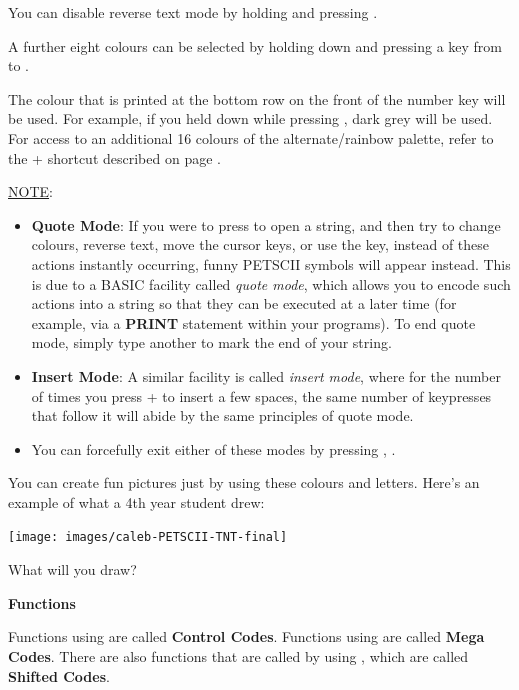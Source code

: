 You can disable reverse text mode by holding  and pressing .

A further eight colours can be selected by holding down \megasymbolkey and pressing a key from  to .

The colour that is printed at the bottom row on the front of the number key will be used. For example, if you held
\megasymbolkey down while pressing , dark grey will be used. For access to an additional 16 colours of the alternate/rainbow palette, refer to the  +  shortcut described on page \pageref{appendix:controlcodes}.

\underline{NOTE}:
\begin{itemize}
  \item {\bf Quote Mode}: If you were to press  to open a string, and then try to change
colours, reverse text, move the cursor keys, or use the  key, instead
of these actions instantly occurring, funny PETSCII symbols will appear instead. This is
due to a BASIC facility called {\it quote mode},
which allows you to encode such actions into a string so that they can be executed at a later
time (for example, via a {\bf PRINT} statement within your programs). To end quote mode, simply
type another  to mark the end of your string.
  \item {\bf Insert Mode}: A similar facility is called
{\it insert mode}, where for the number of times you press  + 
to insert a few spaces, the same number of keypresses that follow it will abide by the same
principles of quote mode.
  \item You can forcefully exit either of these modes by pressing , .
\end{itemize}

\needspace{4cm}
You can create fun pictures just by using these colours and letters. Here's an example of what a 4th year student drew:

\begin{center}
\texttt{[image: images/caleb-PETSCII-TNT-final]}
\end{center}

What will you draw?

\needspace{2cm}
\textbf{Functions}

Functions using  are called \textbf{Control Codes}.
Functions using \megasymbolkey are called \textbf{Mega Codes}. There are also functions that are called by using , which are called \textbf{Shifted Codes}.

